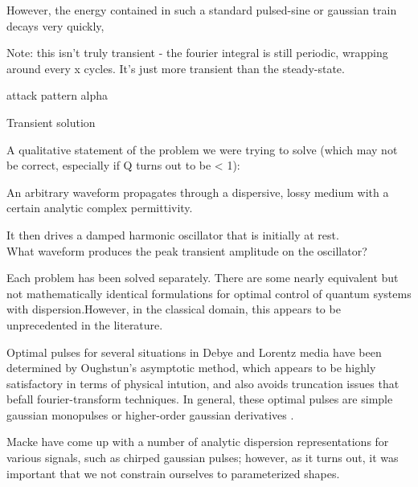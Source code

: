 \documentclass[paper.tex]{subfiles}
\begin{document}
However, the energy contained in such a standard pulsed-sine or gaussian train decays very quickly, 







Note: this isn't truly transient - the fourier integral is still periodic, wrapping around every x cycles. It's just more transient than the steady-state.




attack pattern alpha


Transient solution

\pagebreak
A qualitative statement of the problem we were trying to solve (which may not be correct, especially if Q turns out to be < 1):

\begin{toolchain}
An arbitrary waveform propagates through a dispersive, lossy medium with a certain analytic complex 
permittivity. 

It then drives a damped harmonic oscillator that is initially at rest.\\

What waveform produces the peak transient amplitude on the oscillator?
\end{toolchain}


Each problem has been solved separately. There are some nearly equivalent but not mathematically identical formulations for optimal control of quantum systems with dispersion.\footnotemark However, in the classical domain, this appears to be unprecedented in the literature.




Optimal pulses for several situations in Debye and Lorentz media have been determined by Oughstun's asymptotic method, which appears to be highly satisfactory in terms of physical intution, and also avoids truncation issues that befall fourier-transform techniques. In general, these optimal pulses are simple gaussian monopulses or higher-order gaussian derivatives \cite{Optimal2017} \cite{Optimal2015}. 

Macke \cite{Simple2012} have come up with a number of analytic dispersion representations for various signals, such as chirped gaussian pulses; however, as it turns out, it was important that we not constrain ourselves to parameterized shapes.
\end{document}
